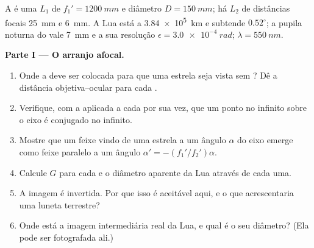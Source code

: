 \begin{problem}
\label{pb:b1:optical-instruments:1}
A  é uma  $L_1$ de 
$f_1' = \qty{1200}{mm}$ e diâmetro $D = \qty{150}{mm}$; há 
$L_2$ de distâncias focais \qty{25}{mm} e \qty{6}{mm}. A
Lua está a \qty{3.84e5}{km} e subtende $0.52^\circ$; a pupila
noturna do  vale \qty{7}{mm} e a sua resolução $\epsilon = \qty{3.0e-4}{rad}$;
$\lambda = \qty{550}{nm}$.

\medskip
\noindent\textbf{Parte I --- O arranjo afocal.}
\begin{enumerate}
  \item Onde a  deve ser colocada para que uma estrela seja vista sem
        ? Dê a distância objetiva--ocular para cada
        .
  \item Verifique, com a  aplicada a cada  por sua vez,
        que um ponto no infinito sobre o eixo é conjugado no infinito.
  \item Mostre que um feixe vindo de uma estrela a um ângulo $\alpha$ do eixo
        emerge como feixe paralelo a um ângulo $\alpha' = -(f_1'/f_2')\alpha$.
  \item Calcule $G$ para cada  e o diâmetro aparente da
        Lua através de cada uma.
  \item A imagem é invertida. Por que isso é aceitável aqui, e o que
        acrescentaria uma luneta terrestre?
  \item Onde está a imagem intermediária real da Lua, e qual é o
        seu diâmetro? (Ela pode ser fotografada ali.)
\end{enumerate}


\end{problem}
